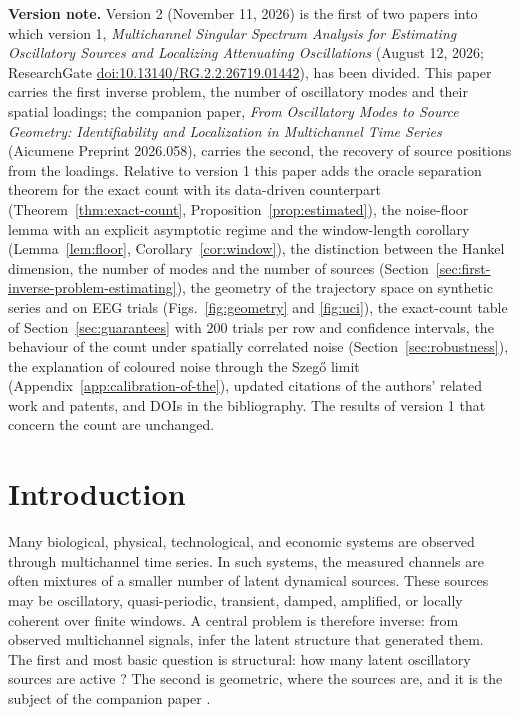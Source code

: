 \documentclass{article}
\begin{document}
\noindent\textbf{Version note.} Version 2 (November 11, 2026) is the first of two papers into which version 1, \emph{Multichannel Singular Spectrum Analysis for Estimating Oscillatory Sources and Localizing Attenuating Oscillations} \cite{ref-MSSAv1} (August 12, 2026; ResearchGate \href{https://doi.org/10.13140/RG.2.2.26719.01442}{doi:10.13140/RG.2.2.26719.01442}), has been divided. This paper carries the first inverse problem, the number of oscillatory modes and their spatial loadings; the companion paper, \emph{From Oscillatory Modes to Source Geometry: Identifiability and Localization in Multichannel Time Series} (Aicumene Preprint 2026.058), carries the second, the recovery of source positions from the loadings. Relative to version 1 this paper adds the oracle separation theorem for the exact count with its data-driven counterpart (Theorem~\ref{thm:exact-count}, Proposition~\ref{prop:estimated}), the noise-floor lemma with an explicit asymptotic regime and the window-length corollary (Lemma~\ref{lem:floor}, Corollary~\ref{cor:window}), the distinction between the Hankel dimension, the number of modes and the number of sources (Section~\ref{sec:first-inverse-problem-estimating}), the geometry of the trajectory space on synthetic series and on EEG trials (Figs.~\ref{fig:geometry} and \ref{fig:uci}), the exact-count table of Section~\ref{sec:guarantees} with $200$ trials per row and confidence intervals, the behaviour of the count under spatially correlated noise (Section~\ref{sec:robustness}), the explanation of coloured noise through the Szeg\H{o} limit (Appendix~\ref{app:calibration-of-the}), updated citations of the authors' related work and patents, and DOIs in the bibliography. The results of version 1 that concern the count are unchanged.


\section{Introduction}\label{sec:introduction}

Many biological, physical, technological, and economic systems are observed through multichannel time series. In such systems, the measured channels are often mixtures of a smaller number of latent dynamical sources. These sources may be oscillatory, quasi-periodic, transient, damped, amplified, or locally coherent over finite windows. A central problem is therefore inverse: from observed multichannel signals, infer the latent structure that generated them. The first and most basic question is structural: how many latent oscillatory sources are active \cite{ref-BernadotteBuchstaber, ref-Bernadotte05}? The second is geometric, where the sources are, and it is the subject of the companion paper \cite{ref-companion}.
\end{document}
